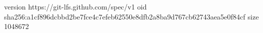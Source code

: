 version https://git-lfs.github.com/spec/v1
oid sha256:a1cf896dcbbd2be7fce4c7efeb62550e8dfb2a8ba9d767cb62743aea5e0f84cf
size 1048672
